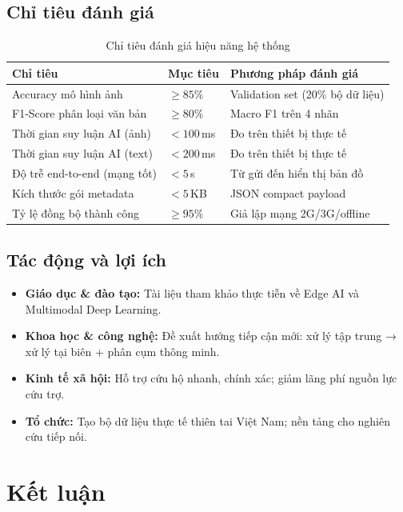 \documentclass[12pt, a4paper]{report}
\begin{document}
\section{Chỉ tiêu đánh giá}

\begin{table}[H]
\centering
\caption{Chỉ tiêu đánh giá hiệu năng hệ thống}
\label{tab:metrics}
\begin{tabular}{lll}
\toprule
\textbf{Chỉ tiêu} & \textbf{Mục tiêu} & \textbf{Phương pháp đánh giá} \\
\midrule
Accuracy mô hình ảnh & $\geq 85\%$ & Validation set (20\% bộ dữ liệu) \\
F1-Score phân loại văn bản & $\geq 80\%$ & Macro F1 trên 4 nhãn \\
Thời gian suy luận AI (ảnh) & $<100$\,ms & Đo trên thiết bị thực tế \\
Thời gian suy luận AI (text) & $<200$\,ms & Đo trên thiết bị thực tế \\
Độ trễ end-to-end (mạng tốt) & $<5$\,s & Từ gửi đến hiển thị bản đồ \\
Kích thước gói metadata & $<5$\,KB & JSON compact payload \\
Tỷ lệ đồng bộ thành công & $\geq 95\%$ & Giả lập mạng 2G/3G/offline \\
\bottomrule
\end{tabular}
\end{table}

\section{Tác động và lợi ích}

\begin{itemize}
  \item \textbf{Giáo dục \& đào tạo:} Tài liệu tham khảo thực tiễn về Edge AI và Multimodal Deep Learning.
  \item \textbf{Khoa học \& công nghệ:} Đề xuất hướng tiếp cận mới: xử lý tập trung → xử lý tại biên + phân cụm thông minh.
  \item \textbf{Kinh tế xã hội:} Hỗ trợ cứu hộ nhanh, chính xác; giảm lãng phí nguồn lực cứu trợ.
  \item \textbf{Tổ chức:} Tạo bộ dữ liệu thực tế thiên tai Việt Nam; nền tảng cho nghiên cứu tiếp nối.
\end{itemize}

\chapter*{Kết luận}
\end{document}
